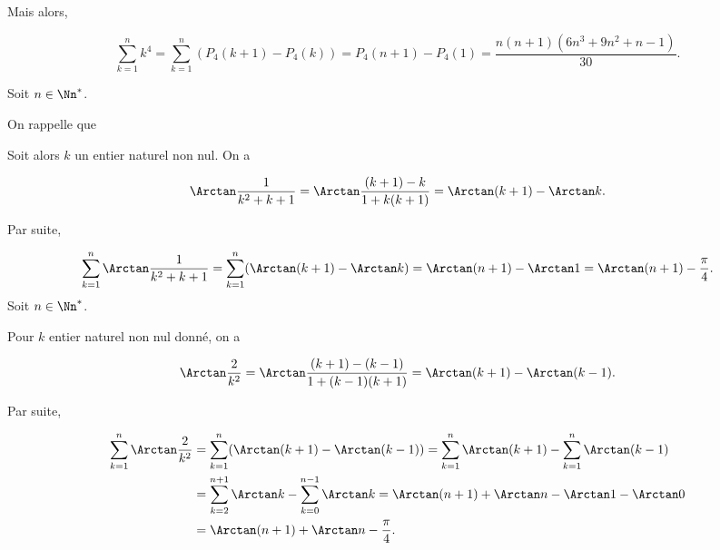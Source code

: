 {\begin{enumerate}
{\begin{itemize}
Mais alors,

$$\sum_{k=1}^{n}k^4=\sum_{k=1}^{n}(P_4(k+1)-P_4(k))=P_4(n+1)-P_4(1)=\frac{n(n+1)(6n^3+9n^2+n-1)}{30}.$$
\end{itemize}
\begin{center}
\end{center}
Soit $n\in\Nn^*$.

On rappelle que 
\begin{center}
\shadowbox{
$\forall(a,b)\in]0,+\infty[^2,\;\Arctan a-\Arctan b=\Arctan\frac{a-b}{1+ab}.$
}
\end{center}

Soit alors $k$ un entier naturel non nul. On a

$$\Arctan\frac{1}{k^2+k+1}=\Arctan\frac{(k+1)-k}{1+k(k+1)}=\Arctan(k+1)-\Arctan k.$$

Par suite,

$$\sum_{k=1}^{n}\Arctan\frac{1}{k^2+k+1}=\sum_{k=1}^{n}(\Arctan(k+1)-\Arctan
k)=\Arctan(n+1)-\Arctan1=\Arctan(n+1)-\frac{\pi}{4}.$$
Soit $n\in\Nn^*$.

Pour $k$ entier naturel non nul donné, on a

$$\Arctan\frac{2}{k^2}=\Arctan\frac{(k+1)-(k-1)}{1+(k-1)(k+1)}=\Arctan(k+1)-\Arctan(k-1).$$

Par suite,

\begin{align*}
\sum_{k=1}^{n}\Arctan\frac{2}{k^2}&=\sum_{k=1}^{n}(\Arctan(k+1)-\Arctan
(k-1))=\sum_{k=1}^{n}\Arctan(k+1)-\sum_{k=1}^{n}\Arctan(k-1)\\
 &=\sum_{k=2}^{n+1}\Arctan k-\sum_{k=0}^{n-1}\Arctan k=\Arctan(n+1)+\Arctan n-\Arctan1-\Arctan0\\
 &=\Arctan(n+1)+\Arctan n-\frac{\pi}{4}.
\end{align*}
}
\end{enumerate}
}
